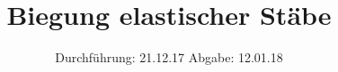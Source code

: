 

\subject{V103}
\title{Biegung elastischer Stäbe}
\date{%
  Durchführung: 21.12.17
  \hspace{3em}
  Abgabe: 12.01.18
}



\maketitle
\thispagestyle{empty}
\tableofcontents
\newpage






\printbibliography{}


